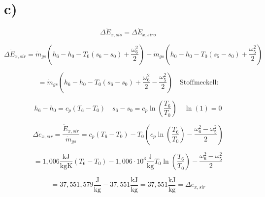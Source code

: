 

\section*{c)}

\[
\Delta \dot{E}_{x,sis} = \Delta \dot{E}_{x,siro}
\]

\[
\Delta \dot{E}_{x,sir} = \dot{m}_{gs} \left( h_6 - h_0 - T_0 (s_6 - s_0) + \frac{\omega_6^2}{2} \right) - \dot{m}_{gs} \left( h_0 - h_0 - T_0 (s_5 - s_0) + \frac{\omega_5^2}{2} \right)
\]

\[
= \dot{m}_{gs} \left( h_6 - h_0 - T_0 (s_6 - s_0) + \frac{\omega_6^2}{2} - \frac{\omega_5^2}{2} \right) \quad \text{Stoffmeckell:}
\]

\[
h_6 - h_0 = c_p (T_6 - T_0) \quad s_6 - s_0 = c_p \ln \left( \frac{T_6}{T_0} \right) \quad \ln(1) = 0
\]

\[
\Delta \dot{e}_{x,sir} = \frac{\dot{E}_{x,sir}}{\dot{m}_{gs}} = c_p (T_6 - T_0) - T_0 \left( c_p \ln \left( \frac{T_6}{T_0} \right) - \frac{\omega_6^2 - \omega_5^2}{2} \right)
\]

\[
= 1,006 \frac{\text{kJ}}{\text{kgK}} (T_6 - T_0) - 1,006 \cdot 10^3 \frac{\text{J}}{\text{kg}} T_0 \ln \left( \frac{T_6}{T_0} \right) - \frac{\omega_6^2 - \omega_5^2}{2}
\]

\[
= 37,551,579 \frac{\text{J}}{\text{kg}} - 37,551 \frac{\text{kJ}}{\text{kg}} = 37,551 \frac{\text{kJ}}{\text{kg}} = \Delta \dot{e}_{x,sir}
\]